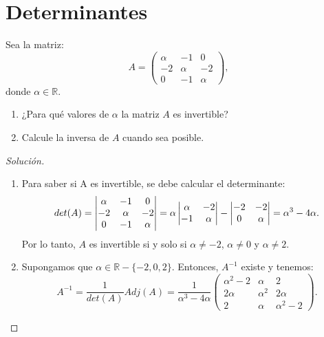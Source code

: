 \documentclass[a4,11pt]{aleph-notas}
\begin{document}
\encabezado

\section{Determinantes}

\begin{ejer}
    Sea la matriz:
    \[
        A= \begin{pmatrix}
            \alpha & -1 & 0 \\
            -2 & \alpha & -2 \\
            0 & -1 & \alpha
        \end{pmatrix},
    \]
    donde $\alpha \in \mathbb{R}$.
    \begin{enumerate}
    \item 
        ¿Para qu\'{e} valores de $\alpha$ la matriz $A$ es invertible? 
    \item 
        Calcule la inversa de $A$ cuando sea posible.
    \end{enumerate}
\end{ejer}

\begin{proof}[Solución]\hspace{0pt}
    \begin{enumerate}
    \item 
    Para saber si A es invertible, se debe calcular el determinante: 
    \[
    det(A)=\begin{vmatrix}
                \alpha & -1 & 0 \\
                -2 & \alpha & -2 \\
                0 & -1 & \alpha
                \end{vmatrix}=\alpha \begin{vmatrix}
                \alpha & -2 \\
                -1 & \alpha
                \end{vmatrix}-\begin{vmatrix}
                -2 & -2 \\
                0 & \alpha
                \end{vmatrix}=\alpha^3-4\alpha.\\
    \]
    Por lo tanto, $A$ es invertible si y solo si $\alpha \neq-2$, $\alpha\neq0$ y $\alpha\neq2$.
    
    \item Supongamos que $\alpha \in \mathbb{R}-\{-2, 0, 2\}$. Entonces, $A^{-1}$ existe y tenemos:
    \[
    A^{-1}=\frac{1}{det(A)}Adj(A)=\frac{1}{\alpha^3-4\alpha}   \begin{pmatrix}
                \alpha^2-2 & \alpha & 2 \\
                2\alpha & \alpha^2 & 2\alpha \\
                2 & \alpha & \alpha^2-2
            \end{pmatrix}.
    \]
    \end{enumerate}
\end{proof}
\end{document}
